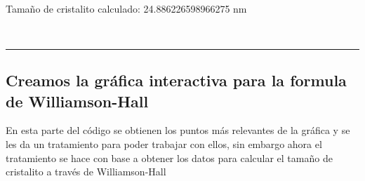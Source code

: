 \documentclass[11pt]{article}
\begin{document}
    ~

Tamaño de cristalito calculado: 24.886226598966275 nm

~

    
    \begin{center}\rule{0.5\linewidth}{0.5pt}\end{center}

    \subsection{Creamos la gráfica interactiva para la formula de
Williamson-Hall}\label{creamos-la-gruxe1fica-interactiva-para-la-formula-de-williamson-hall}

En esta parte del código se obtienen los puntos más relevantes de la
gráfica y se les da un tratamiento para poder trabajar con ellos, sin
embargo ahora el tratamiento se hace con base a obtener los datos para
calcular el tamaño de cristalito a través de Williamson-Hall
\end{document}
